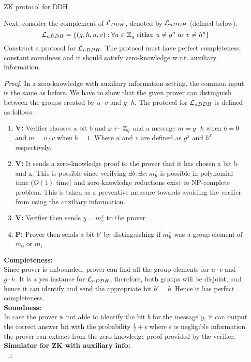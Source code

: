 \begin{solution}{ZK protocol for DDH}\label{ques:23}
    \begin{question}
    Next, consider the complement of $\mathcal{L}_{DDH}$, denoted by $\mathcal{L}_{nDDH}$ (defined below).
    \begin{equation}
        \mathcal{L}_{nDDH} = \{(g,h,u,v): \forall a \in \mathbb{Z}_q \text{ either } u \neq g^a \text{ or } v \neq h^a \}
    \end{equation}
    Construct a protocol for $\mathcal{L}_{nDDH}$. The protocol must have perfect completeness, constant soundness and it should satisfy zero-knowledge w.r.t. auxiliary information.
    \end{question}
    \tcblower{}
    \begin{proof}
    In a zero-knowledge with auxiliary information setting, the common input is the same as before. We have to show that the given prover can distinguish between the groups created by $u\cdot v$ and $g \cdot h$. The protocol for $\mathcal{L}_{nDDH}$ is defined as follows:
    \begin{enumerate}
        \item \textbf{V:} Verifier chooses a bit $b$ and $x\leftarrow \mathbb{Z}_q$ and a message $m=g\cdot h$ when $b = 0$ and $m = u \cdot v$ when $b = 1$. Where $u$ and $v$ are defined as $g^x$ and $h^x$ respectively.
        \item \textbf{V:} It sends a zero-knowledge proof to the prover that it has chosen a bit b and x. This is possible since verifying $\exists b : \exists x : m_b^x$ is possible in polynomial time ($O(1)$ time) and zero-knowledge reductions exist to NP-complete problem. This is taken as a preventive measure towards avoiding the verifier from using the auxiliary information.
        \item \textbf{V:} Verifier then sends $y = m_b^x$ to the prover
        \item \textbf{P:} Prover then sends a bit $b'$ by distinguishing if $m_b^x$ was a group element of $m_0$ or $m_1$
    \end{enumerate}
    \textbf{Completeness:}\\
    Since prover is unbounded, prover can find all the group elements for $u\cdot v$ and $g\cdot h$. It is a yes instance for $\mathcal{L}_{nDDH}$; therefore, both groups will be disjoint, and hence it can identify and send the appropriate bit $b' = b$. Hence it has perfect completeness.\\
    
    \textbf{Soundness:}\\
    In case the prover is not able to identify the bit $b$ for the message $y$, it can output the correct answer bit with the probability $\frac{1}{2}+\epsilon$ where $\epsilon$ is negligible information the prover can extract from the zero-knowledge proof provided by the verifier. \\
    
    \textbf{Simulator for ZK with auxiliary info:}\\
    
    
    \end{proof}
\end{solution}
